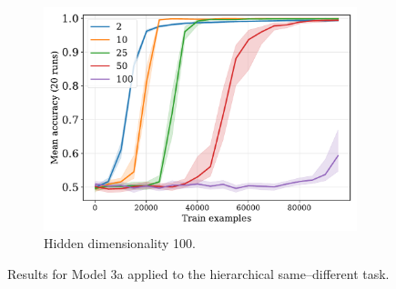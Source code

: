 \begin{figure}[H]
  \begin{subfigure}{0.45\linewidth}
    \includegraphics[width=1\textwidth]{../fig/flatpremack-h2-train_size-embed_dim-hidden_dim=100.pdf}
    \caption{Hidden dimensionality 100.}
    \label{fig:model3a-rep}
  \end{subfigure}
  \caption{Results for Model 3a applied to the hierarchical same--different task.}
  \label{fig:model3a}
\end{figure}

\newpage





